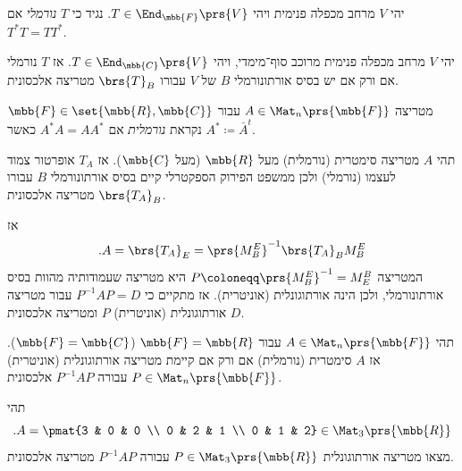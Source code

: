 \documentclass[a4paper,10pt,twoside,openany]{book}
\begin{document}
\begin{definition}
יהי
$V$
מרחב מכפלה פנימית ויהי
$T \in \End_{\mbb{F}}\prs{V}$.
נגיד כי
$T$
\emph{נורמלי}
אם
$T^* T = T T^*$.
\end{definition}

\begin{theorem}
יהי
$V$
מרחב מכפלה פנימית מרוכב סוף־מימדי, ויהי
$T \in \End_{\mbb{C}}\prs{V}$.
אז
$T$
נורמלי אם ורק אם יש בסיס אורתונורמלי
$B$
של
$V$
עבורו
$\brs{T}_B$
מטריצה אלכסונית.
\end{theorem}

\begin{definition}
מטריצה
$A \in \Mat_n\prs{\mbb{F}}$
עבור
$\mbb{F} \in \set{\mbb{R}, \mbb{C}}$
נקראת
\emph{נורמלית}
אם
$A^* A = A A^*$
כאשר
$A^* \coloneqq \bar{A}^t$.
\end{definition}

\begin{remark}
תהי
$A$
מטריצה סימטרית (נורמלית) מעל
$\mbb{R}$
(מעל
$\mbb{C}$).
אז
$T_A$
אופרטור צמוד לעצמו (נורמלי) ולכן ממשפט הפירוק הספקטרלי קיים בסיס אורתונורמלי
$B$
עבורו
$\brs{T_A}_B$
מטריצה אלכסונית.

אז
\[\text{.} A = \brs{T_A}_E = \prs{M^E_B}^{-1} \brs{T_A}_B M^E_B\]
המטריצה
$P \coloneqq \prs{M^E_B}^{-1} = M^B_E$
היא מטריצה שעמודותיה מהוות בסיס אורתונורמלי, ולכן הינה אורתוגונלית (אוניטרית). אז מתקיים כי
$P^{-1} A P = D$
עבור מטריצה אורתוגונלית (אוניטרית)
$P$
ומטריצה אלכסונית
$D$.
\end{remark}

\begin{theorem}
תהי
$A \in \Mat_n\prs{\mbb{F}}$
עבור
$\mbb{F} = \mbb{R}$
($\mbb{F} = \mbb{C}$).
אז
$A$
סימטרית (נורמלית) אם ורק אם קיימת מטריצה אורתוגונלית (אוניטרית)
$P \in \Mat_n\prs{\mbb{F}}$
עבורה
$P^{-1} A P$
אלכסונית.
\end{theorem}

\begin{exercisechap}
תהי
\[\text{.} A = \pmat{3 & 0 & 0 \\ 0 & 2 & 1 \\ 0 & 1 & 2} \in \Mat_3\prs{\mbb{R}}\]
מצאו מטריצה אורתוגונלית
$P \in \Mat_3\prs{\mbb{R}}$
עבורה
$P^{-1} A P$
מטריצה אלכסונית.
\end{exercisechap}
\end{document}
